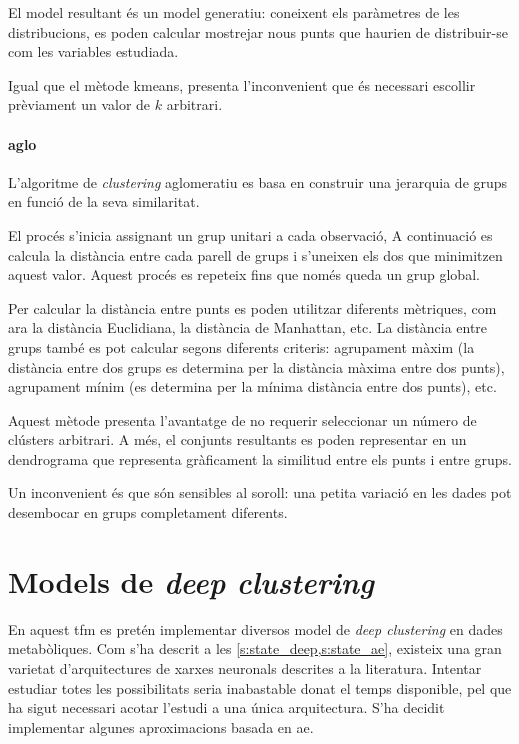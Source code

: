 \documentclass[CAT,BIB]{TFUOC}%
\begin{document}
        El model resultant és un model generatiu:
        coneixent els paràmetres de les distribucions,
        es poden calcular mostrejar nous punts
        que haurien de distribuir-se com les variables estudiada.

        Igual que el mètode \gls{kmeans},
        presenta l'inconvenient que és necessari escollir prèviament
        un valor de $k$ arbitrari.

    \paragraph{\Gls{aglo}}
        L'algoritme de \textit{clustering} aglomeratiu
        es basa en construir una jerarquia
        de grups en funció de la seva similaritat.

        El procés s'inicia assignant un grup unitari a cada observació,
        A continuació es calcula la distància entre cada parell de grups
        i s'uneixen els dos que minimitzen aquest valor.
        Aquest procés es repeteix fins que només queda un grup global.

        Per calcular la distància entre punts
        es poden utilitzar diferents mètriques,
        com ara la distància Euclidiana, la distància de Manhattan, etc.
        La distància entre grups també es pot calcular segons diferents criteris:
        agrupament màxim (la distància entre dos grups es determina per la distància màxima entre dos punts),
        agrupament mínim (es determina per la mínima distància entre dos punts), etc.

        Aquest mètode presenta l'avantatge de no requerir seleccionar un número de clústers arbitrari.
        A més, el conjunts resultants es poden representar en un dendrograma
        que representa gràficament la similitud entre els punts i entre grups.

        Un inconvenient és que són sensibles al soroll:
        una petita variació en les dades pot desembocar en grups completament diferents.

    \section{Models de \textit{deep clustering}}
    \label{s:metodes_dc}

    En aquest \gls{tfm}
    es pretén implementar diversos model de \textit{deep clustering} en dades metabòliques.
    Com s'ha descrit a les \cref{s:state_deep,s:state_ae},
    existeix una gran varietat d'arquitectures de xarxes neuronals descrites a la literatura.
    Intentar estudiar totes les possibilitats seria inabastable donat el temps disponible,
    pel que ha sigut necessari acotar l'estudi a una única arquitectura.
    S'ha decidit implementar algunes aproximacions basada en \gls{ae}.
\end{document}
